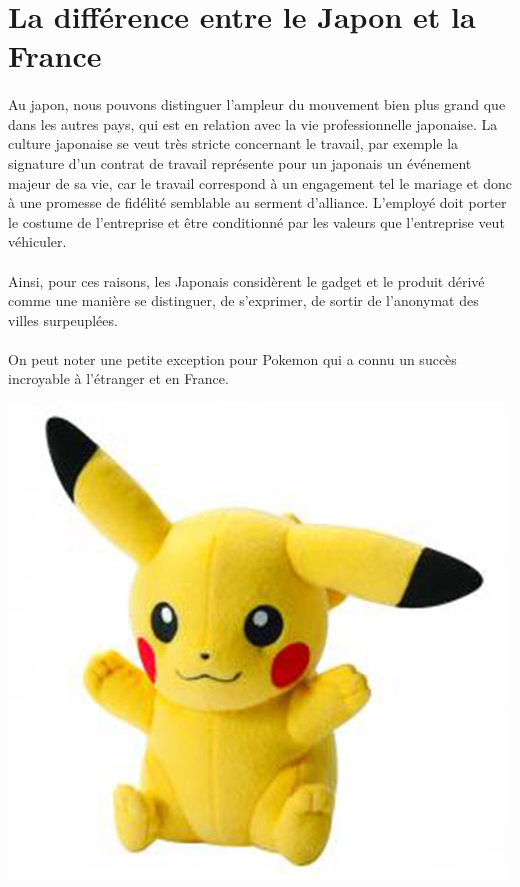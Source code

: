 \section[Différences]{La différence entre le Japon et la France}

\paragraph{} Au japon, nous pouvons distinguer l'ampleur du mouvement bien plus
grand que dans les autres pays, qui est en relation avec la vie professionnelle
japonaise. La culture japonaise se veut très stricte concernant le travail, par
exemple la signature d'un contrat de travail représente pour un japonais un
événement majeur de sa vie, car le travail correspond à un engagement tel le
mariage et donc à une promesse de fidélité semblable au serment d'alliance.
L'employé doit porter le costume de l'entreprise et être conditionné par les
valeurs que l'entreprise veut véhiculer.

\paragraph{} Ainsi, pour ces raisons, les Japonais considèrent le gadget et le
produit dérivé comme une manière se distinguer, de s'exprimer, de sortir de
l'anonymat des villes surpeuplées.

\paragraph{} On peut noter une petite exception pour Pokemon qui a connu un
succès incroyable à l'étranger et en France.

\begin{center}
	\includegraphics[scale=0.15]{pokemon.jpg}
\end{center}

